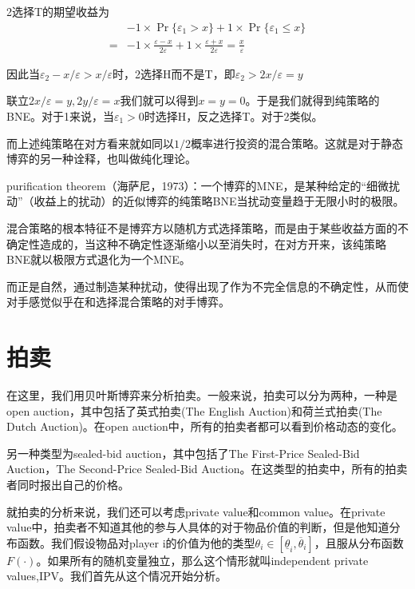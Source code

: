 \documentclass[UTF8,12pt]{ctexart}
\numberwithin{equation}{section} %
\numberwithin{figure}{section}
\numberwithin{table}{section}
\begin{document}
	2选择T的期望收益为
	\begin{equation}
		\begin{aligned}
			&-1 \times \Pr\{\varepsilon_1 > x\} + 1 \times \Pr\{\varepsilon_1 \leqslant x\} \\
			=&-1 \times \frac{\varepsilon-x}{2\varepsilon} + 1 \times \frac{\varepsilon+x}{2\varepsilon} = \frac{x}{\varepsilon}
		\end{aligned}
	\end{equation}
	
	因此当$\varepsilon_2 - x/\varepsilon > x/\varepsilon$时，2选择H而不是T，即$\varepsilon_2 > 2x/\varepsilon = y$
	
	联立$2x/\varepsilon = y,2y/\varepsilon = x$我们就可以得到$x= y = 0$。于是我们就得到纯策略的BNE。对于1来说，当$\varepsilon_1 > 0$时选择H，反之选择T。对于2类似。
	
	而上述纯策略在对方看来就如同以$1/2$概率进行投资的混合策略。这就是对于静态博弈的另一种诠释，也叫做纯化理论。
	
	purification theorem（海萨尼，1973）：一个博弈的MNE，是某种给定的“细微扰动”（收益上的扰动）的近似博弈的纯策略BNE当扰动变量趋于无限小时的极限。
	
	混合策略的根本特征不是博弈方以随机方式选择策略，而是由于某些收益方面的不确定性造成的，当这种不确定性逐渐缩小以至消失时，在对方开来，该纯策略BNE就以极限方式退化为一个MNE。
	
	而正是自然，通过制造某种扰动，使得出现了作为不完全信息的不确定性，从而使对手感觉似乎在和选择混合策略的对手博弈。

	\newpage
	
	\section{拍卖}
	在这里，我们用贝叶斯博弈来分析拍卖。一般来说，拍卖可以分为两种，一种是open auction，其中包括了英式拍卖(The English Auction)和荷兰式拍卖(The Dutch Auction)。在open auction中，所有的拍卖者都可以看到价格动态的变化。
	
	另一种类型为sealed-bid auction，其中包括了The First-Price Sealed-Bid Auction，The Second-Price Sealed-Bid Auction。在这类型的拍卖中，所有的拍卖者同时报出自己的价格。
	
	就拍卖的分析来说，我们还可以考虑private value和common value。在private value中，拍卖者不知道其他的参与人具体的对于物品价值的判断，但是他知道分布函数。我们假设物品对player i的价值为他的类型$\theta_i \in [\underline{\theta}_i,\overline{\theta}_i]$，且服从分布函数$F(\cdot)$。如果所有的随机变量独立，那么这个情形就叫independent private values,IPV。我们首先从这个情况开始分析。
	
\end{document}
